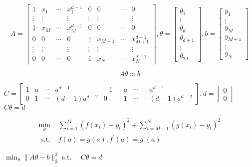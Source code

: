 $$ A=\left[\begin{array}{cccccccc}1 & x_{1} & \cdots & x_{1}^{d-1} & 0 & 0 & \cdots & 0 \\ \vdots & \vdots & & \vdots & \vdots & \vdots & & \vdots \\ 1 & x_{M} & \cdots & x_{M}^{d-1} & 0 & 0 & \cdots & 0 \\ 0 & 0 & \cdots & 0 & 1 & x_{M+1} & \cdots & x_{M+1}^{d-1} \\ \vdots & \vdots & & \vdots & \vdots & \vdots & & \vdots \\ 0 & 0 & \cdots & 0 & 1 & x_{N} & \cdots & x_{N}^{d-1}\end{array}\right], \theta=\left[\begin{array}{c}\theta_{1} \\ \vdots \\ \theta_{d} \\ \theta_{d+1} \\ \vdots \\ \theta_{2 d}\end{array}\right], b=\left[\begin{array}{c}y_{1} \\ \vdots \\ y_{M} \\ y_{M+1} \\ \vdots \\ y_{N}\end{array}\right] $$

$$ A \theta \approx b $$

$ C=\left[\begin{array}{cccccccc}1 & a & \cdots & a^{d-1} & -1 & -a & \cdots & -a^{d-1} \\ 0 & 1 & \cdots & (d-1) a^{d-2} & 0 & -1 & \cdots & -(d-1) a^{d-2}\end{array}\right], d=\left[\begin{array}{l}0 \\ 0\end{array}\right] $
$ C \theta=d $

$$ \begin{array}{ll}\min _{\theta} & \sum_{i=1}^{M}\left(f\left(x_{i}\right)-y_{i}\right)^{2}+\sum_{i=M+1}^{N}\left(g\left(x_{i}\right)-y_{i}\right)^{2} \\ \text { s.t. } & f(a)=g(a), f^{\prime}(a)=g^{\prime}(a)\end{array} $$

$ \min _{\theta}\|A \theta-b\|_{2}^{2} $
s.t. $ \quad C \theta=d $



